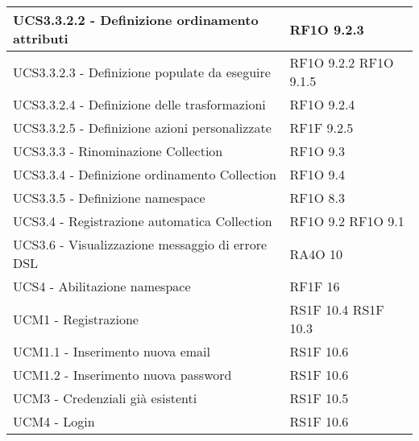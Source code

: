 \begin{center}
\begin{longtable}{ | p{5cm} | p{5cm} |}
            UCS3.3.2.2 - Definizione ordinamento attributi &  RF1O 9.2.3 \newline  \\ \hline      
            UCS3.3.2.3 - Definizione populate da eseguire &  RF1O 9.2.2  \newline  RF1O 9.1.5 \newline  \\ \hline      
            UCS3.3.2.4 - Definizione delle trasformazioni &  RF1O 9.2.4 \newline  \\ \hline      
            UCS3.3.2.5 - Definizione azioni personalizzate &  RF1F 9.2.5 \newline  \\ \hline      
            UCS3.3.3 - Rinominazione Collection &  RF1O 9.3 \newline  \\ \hline      
            UCS3.3.4 - Definizione ordinamento Collection &  RF1O 9.4 \newline  \\ \hline      
            UCS3.3.5 - Definizione namespace &  RF1O 8.3 \newline  \\ \hline      
            UCS3.4 - Registrazione automatica Collection &  RF1O 9.2 \newline  RF1O 9.1  \newline  \\ \hline      
            UCS3.6 - Visualizzazione messaggio di errore DSL &  RA4O 10 \newline  \\ \hline      
            UCS4 - Abilitazione namespace &  RF1F 16 \newline  \\ \hline      
            UCM1 - Registrazione &  RS1F 10.4 \newline  RS1F 10.3 \newline  \\ \hline      
            UCM1.1 - Inserimento nuova email &  RS1F 10.6 \newline  \\ \hline      
            UCM1.2 - Inserimento nuova password &  RS1F 10.6 \newline  \\ \hline      
            UCM3 - Credenziali già esistenti &  RS1F 10.5 \newline  \\ \hline      
            UCM4 - Login &  RS1F 10.6 \newline  \\ \hline      

\end{longtable}
\end{center}
